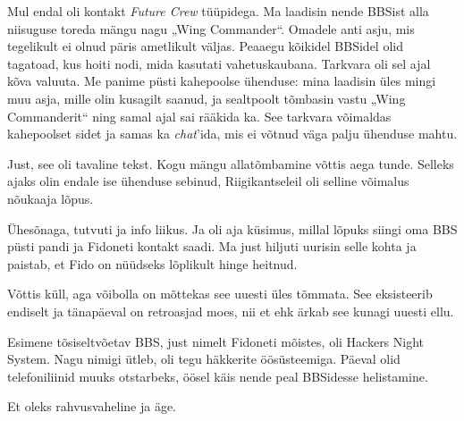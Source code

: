Mul endal oli kontakt \emph{Future Crew} tüüpidega. Ma laadisin nende BBSist alla niisuguse 
toreda mängu nagu „Wing Commander“. 
Omadele anti asju, mis tegelikult ei olnud
päris ametlikult väljas. Peaaegu kõikidel BBSidel olid tagatoad, 
kus hoiti nodi, mida kasutati vahetuskaubana. Tarkvara oli sel 
ajal kõva valuuta. Me panime püsti kahepoolse ühenduse: mina 
laadisin üles mingi muu asja, mille olin kusagilt saanud, ja 
sealtpoolt tõmbasin vastu „Wing Commanderit“ ning samal ajal sai rääkida ka. 
See tarkvara võimaldas kahepoolset sidet ja samas ka 
\emph{chat}'ida, mis ei võtnud väga palju ühenduse mahtu.


Just, see oli tavaline tekst. Kogu mängu allatõmbamine võttis 
aega tunde. Selleks ajaks olin endale ise ühenduse sebinud, Riigikantseleil oli
selline võimalus nõukaaja lõpus. 

Ühesõnaga, tutvuti ja info liikus. Ja oli aja küsimus, millal lõpuks siingi 
oma BBS püsti pandi ja Fidoneti kontakt saadi. Ma just hiljuti uurisin selle 
kohta ja paistab, et Fido on nüüdseks lõplikult hinge heitnud.


Võttis küll, aga võibolla on mõttekas see uuesti üles tõmmata. See eksisteerib endiselt ja 
tänapäeval on retroasjad moes, nii et ehk ärkab see kunagi uuesti ellu.


Esimene tõsiseltvõetav BBS, just nimelt Fidoneti mõistes, oli Hackers Night 
System. Nagu 
nimigi ütleb, oli tegu häkkerite öösüsteemiga. Päeval olid telefoniliinid muuks 
otstarbeks, öösel käis nende peal BBSidesse helistamine. 


Et oleks rahvusvaheline ja äge.

